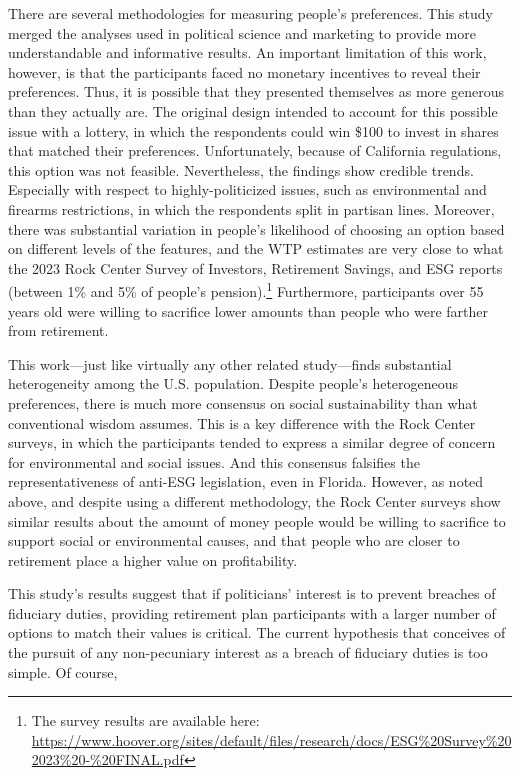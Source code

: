 \documentclass[
  12pt,
]{article}
\begin{document}
There are several methodologies for measuring people's preferences. This study merged the analyses used in political science and marketing to provide more understandable and informative results. An important limitation of this work, however, is that the participants faced no monetary incentives to reveal their preferences. Thus, it is possible that they presented themselves as more generous than they actually are. The original design intended to account for this possible issue with a lottery, in which the respondents could win \$100 to invest in shares that matched their preferences. Unfortunately, because of California regulations, this option was not feasible. Nevertheless, the findings show credible trends. Especially with respect to highly-politicized issues, such as environmental and firearms restrictions, in which the respondents split in partisan lines. Moreover, there was substantial variation in people's likelihood of choosing an option based on different levels of the features, and the WTP estimates are very close to what the 2023 Rock Center Survey of Investors, Retirement Savings, and ESG reports (between 1\% and 5\% of people's pension).\footnote{The survey results are available here: \url{https://www.hoover.org/sites/default/files/research/docs/ESG\%20Survey\%202023\%20-\%20FINAL.pdf}} Furthermore, participants over 55 years old were willing to sacrifice lower amounts than people who were farther from retirement.

This work---just like virtually any other related study---finds substantial heterogeneity among the U.S. population. Despite people's heterogeneous preferences, there is much more consensus on social sustainability than what conventional wisdom assumes. This is a key difference with the Rock Center surveys, in which the participants tended to express a similar degree of concern for environmental and social issues. And this consensus falsifies the representativeness of anti-ESG legislation, even in Florida. However, as noted above, and despite using a different methodology, the Rock Center surveys show similar results about the amount of money people would be willing to sacrifice to support social or environmental causes, and that people who are closer to retirement place a higher value on profitability.

This study's results suggest that if politicians' interest is to prevent breaches of fiduciary duties, providing retirement plan participants with a larger number of options to match their values is critical. The current hypothesis that conceives of the pursuit of any non-pecuniary interest as a breach of fiduciary duties is too simple. Of course,
\end{document}
